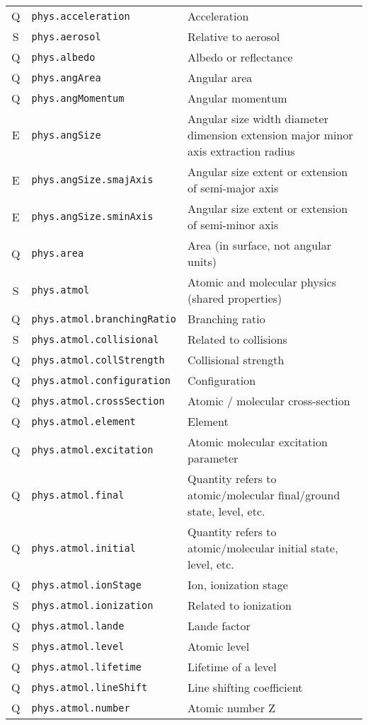 \documentclass[11pt,a4paper]{ivoa}
\begin{document}
\begin{longtable}[h!]{c|p{40ex}|p{}}
Q & {\tt phys.acceleration} & Acceleration\\
S & {\tt phys.aerosol} & Relative to aerosol\\
Q & {\tt phys.albedo} & Albedo or reflectance\\
Q & {\tt phys.angArea} & Angular area\\
Q & {\tt phys.angMomentum} & Angular momentum\\
E & {\tt phys.angSize} & Angular size width diameter dimension extension major minor axis extraction radius\\
E & {\tt phys.angSize.smajAxis} & Angular size extent or extension of semi-major axis\\
E & {\tt phys.angSize.sminAxis} & Angular size extent or extension of semi-minor axis\\
Q & {\tt phys.area} & Area (in surface, not angular units)\\
S & {\tt phys.atmol} & Atomic and molecular physics (shared properties)\\
Q & {\tt phys.atmol.branchingRatio} & Branching ratio\\
S & {\tt phys.atmol.collisional} & Related to collisions\\
Q & {\tt phys.atmol.collStrength} & Collisional strength\\
Q & {\tt phys.atmol.configuration} & Configuration\\
Q & {\tt phys.atmol.crossSection} & Atomic / molecular cross-section\\
Q & {\tt phys.atmol.element} & Element\\
Q & {\tt phys.atmol.excitation} & Atomic molecular excitation parameter\\
Q & {\tt phys.atmol.final} & Quantity refers to atomic/molecular final/ground state, level, etc.\\
Q & {\tt phys.atmol.initial} & Quantity refers to atomic/molecular initial state, level, etc.\\
Q & {\tt phys.atmol.ionStage} & Ion, ionization stage\\
S & {\tt phys.atmol.ionization} & Related to ionization\\
Q & {\tt phys.atmol.lande} & Lande factor\\
S & {\tt phys.atmol.level} & Atomic level\\
Q & {\tt phys.atmol.lifetime} & Lifetime of a level\\
Q & {\tt phys.atmol.lineShift} & Line shifting coefficient\\
Q & {\tt phys.atmol.number} & Atomic number Z\\

\end{longtable}
\end{document}
